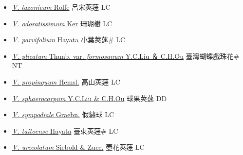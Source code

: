 \begin{itemize}
\begin{itemize}
        \item[] \href{http://www.theplantlist.org/tpl1.1/search?q=Viburnum+luzonicum}{\textit{V. luzonicum} Rolfe}   呂宋莢蒾 LC
        \item[] \href{http://www.theplantlist.org/tpl1.1/search?q=Viburnum+odoratissimum}{\textit{V. odoratissimum} Ker}   珊瑚樹 LC
        \item[] \href{http://www.theplantlist.org/tpl1.1/search?q=Viburnum+parvifolium}{\textit{V. parvifolium} Hayata}   小葉莢蒾\# LC
        \item[] \href{http://www.theplantlist.org/tpl1.1/search?q=Viburnum+plicatum+var.+formosanum}{\textit{V. plicatum} Thunb. var. \textit{formosanum} Y.C.Liu ＆ C.H.Ou}   臺灣蝴蝶戲珠花\# NT
        \item[] \href{http://www.theplantlist.org/tpl1.1/search?q=Viburnum+propinquum}{\textit{V. propinquum} Hemsl.}   高山莢蒾 LC
        \item[] \href{http://www.theplantlist.org/tpl1.1/search?q=Viburnum+sphaerocarpum}{\textit{V. sphaerocarpum} Y.C.Liu \& C.H.Ou}   球果莢蒾 DD
        \item[] \href{http://www.theplantlist.org/tpl1.1/search?q=Viburnum+sympodiale}{\textit{V. sympodiale} Graebn.}   假繡球 LC
        \item[] \href{http://www.theplantlist.org/tpl1.1/search?q=Viburnum+taitoense}{\textit{V. taitoense} Hayata}   臺東莢蒾\# LC
        \item[] \href{http://www.theplantlist.org/tpl1.1/search?q=Viburnum+urceolatum}{\textit{V. urceolatum} Siebold \& Zucc.}   壺花莢蒾 LC
  \end{itemize}
  \end{itemize}

